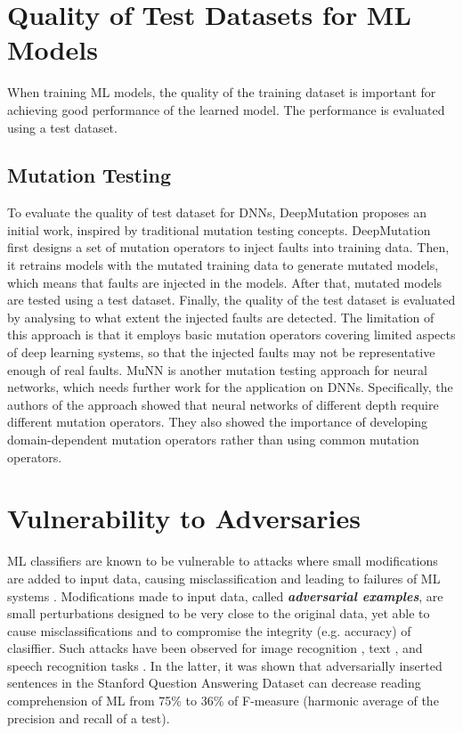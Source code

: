 \documentclass[letterpaper]{article} %
\begin{document}
\section{Quality of Test Datasets for ML Models}
When training ML models, the quality of the training dataset is important for achieving good performance of the learned model. The performance is evaluated using a test dataset. 

\subsection{Mutation Testing}
To evaluate the quality of test dataset for DNNs, DeepMutation \cite{Ma2018b} proposes an initial work, inspired by traditional mutation testing concepts. DeepMutation first designs a set of mutation operators to inject faults into training data. Then, it retrains models with the mutated training data to generate mutated models, which means that faults are injected in the models. After that, mutated models are tested using a test dataset. Finally, the quality of the test dataset is evaluated by analysing to what extent the injected faults are detected. The limitation of this approach is that it employs basic mutation operators covering limited aspects of deep learning systems, so that the injected faults may not be representative enough of real faults. MuNN \cite{Shen2018} is another mutation testing approach for neural networks, which needs further work for the application on DNNs. Specifically, the authors of the approach showed that neural networks of different depth require different mutation operators. They also showed the importance of developing domain-dependent mutation operators rather than using common mutation operators.

\section{Vulnerability to Adversaries}
ML classifiers are known to be vulnerable to attacks where small modifications are added to input data, causing misclassification and leading to failures of ML systems \cite{Szegedy2014}. Modifications made to input data, called \textbf{\textit{adversarial examples}}, are small perturbations designed to be very close to the original data, yet able to cause misclassifications and to compromise the integrity (e.g. accuracy) of clasiffier. Such attacks have been observed for image recognition \cite{Xie2017}, text \cite{Sato2018}, and speech recognition tasks \cite{Carlini2016} \cite{Carlini2018} \cite{Jia2017}. In the latter, it was shown that adversarially inserted sentences in the Stanford Question Answering Dataset can decrease reading comprehension of ML from 75\% to 36\% of F-measure (harmonic average of the precision and recall of a test).
\end{document}
